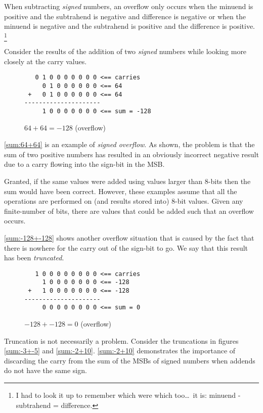 When subtracting {\em signed} numbers, an overflow only occurs when the
minuend is positive and the subtrahend is negative and difference is negative
or when the minuend is negative and the subtrahend is positive and the 
difference is positive.%
\footnote{I had to look it up to remember which were which 
too\ldots\ it is: minuend - subtrahend = difference.\cite{subtrahend}}

Consider the results of the addition of two {\em signed} numbers
while looking more closely at the carry values.

\begin{figure}[H]
\centering
\begin{BVerbatim}
   0 1 0 0 0 0 0 0 0 <== carries
     0 1 0 0 0 0 0 0 <== 64
 +   0 1 0 0 0 0 0 0 <== 64
---------------------
     1 0 0 0 0 0 0 0 <== sum = -128
\end{BVerbatim}
\caption{$64+64 = -128$ (overflow)}
\label{sum:64+64}
\end{figure}



\autoref{sum:64+64} is an example of {\em signed overflow}.  As shown, the problem is 
that the sum of two positive numbers has resulted in an obviously incorrect
negative result due to a carry flowing into the sign-bit in the MSB.

Granted, if the same values were added using values larger than 8-bits 
then the sum would have been correct.  However, these examples assume that 
all the operations are performed on (and results stored into) 8-bit values.  
Given any finite-number of bits, there are values that could be added such that
an overflow occurs.

\autoref{sum:-128+-128} shows another overflow situation that is caused 
by the fact that there is nowhere for the carry out of the sign-bit to go.  
We say that this result has been {\em truncated}.

\begin{figure}[H]
\centering
\begin{BVerbatim}
   1 0 0 0 0 0 0 0 0 <== carries
     1 0 0 0 0 0 0 0 <== -128
 +   1 0 0 0 0 0 0 0 <== -128
---------------------
     0 0 0 0 0 0 0 0 <== sum = 0 
\end{BVerbatim}
\caption{$-128+-128 = 0$ (overflow)}
\label{sum:-128+-128}
\end{figure}

Truncation is not necessarily a problem.  Consider the truncations in
figures \ref{sum:-3+-5} and \ref{sum:-2+10}.  
\autoref{sum:-2+10} demonstrates the importance of discarding 
the carry from the sum of the MSBs of signed numbers when addends
do not have the same sign.

